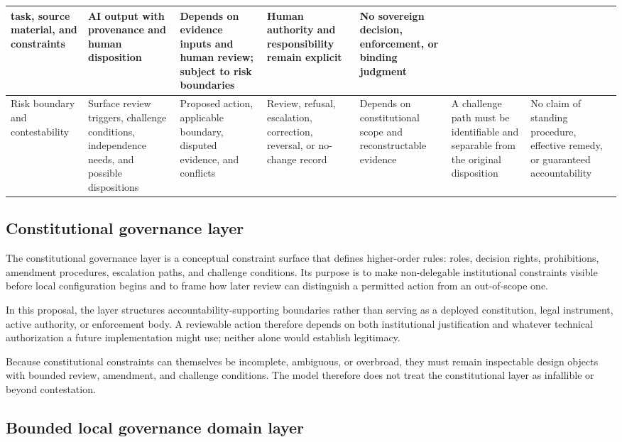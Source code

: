 \documentclass[11pt]{article}
\begin{document}
\begin{landscape}
\begin{center}
\begin{tabularx}{\linewidth}{|X|X|X|X|X|X|X|}
task, source material, and constraints & AI output with provenance and human
disposition & Depends on evidence inputs and human review; subject to risk
boundaries & Human authority and responsibility remain explicit & No sovereign
decision, enforcement, or binding judgment \\
\hline
Risk boundary and contestability & Surface review triggers, challenge
conditions, independence needs, and possible dispositions & Proposed action,
applicable boundary, disputed evidence, and conflicts & Review, refusal,
escalation, correction, reversal, or no-change record & Depends on
constitutional scope and reconstructable evidence & A challenge path must be
identifiable and separable from the original disposition & No claim of standing
procedure, effective remedy, or guaranteed accountability \\
\hline
\end{tabularx}
\end{center}
\end{landscape}

\subsection{Constitutional governance layer}

The constitutional governance layer is a conceptual constraint surface that
defines higher-order rules: roles, decision rights, prohibitions, amendment
procedures, escalation paths, and challenge conditions. Its purpose is to make
non-delegable institutional constraints visible before local configuration
begins and to frame how later review can distinguish a permitted action from
an out-of-scope one.

In this proposal, the layer structures accountability-supporting boundaries rather than
serving as a deployed constitution, legal instrument, active authority, or
enforcement body. A reviewable action therefore depends on both institutional
justification and whatever technical authorization a future implementation
might use; neither alone would establish legitimacy.

Because constitutional constraints can themselves be incomplete, ambiguous, or
overbroad, they must remain inspectable design objects with bounded review,
amendment, and challenge conditions. The model therefore does not treat the
constitutional layer as infallible or beyond contestation.

\subsection{Bounded local governance domain layer}
\end{document}
